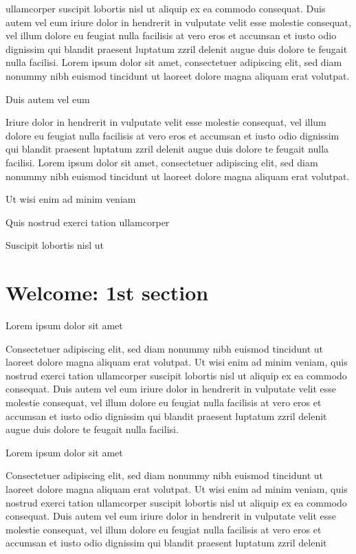 \documentclass[11pt,twoside]{article}\makeatletter
\makeatletter
\renewcommand\section{\@startsection {section}{1}{\z@}%
     {-1.75ex \@plus -0.5ex \@minus -.2ex}%
     {0.5ex \@plus .2ex}%
     {\reset@font\Large\bfseries\sffamily}}
\def\chaptername{Chapter}
\def\mainmatter{%
  \cleardoublepage
  \def\thechapter{\@arabic\c@chapter}
  \setcounter{chapter}{0}
  \setcounter{section}{0}
  \pagenumbering{arabic}
  \setcounter{secnumdepth}{6}
  \def\@chapapp{\chaptername}%
  \def\theHchapter{\arabic{chapter}}
}
\def\DivI{\section}
\def\DivI{\chapter}
\makeatother
\begin{document}
      ullamcorper suscipit lobortis nisl ut aliquip ex ea commodo
      consequat. Duis autem vel eum iriure dolor in hendrerit in vulputate
      velit esse molestie consequat, vel illum dolore eu feugiat nulla
      facilisis at vero eros et accumsan et iusto odio dignissim qui blandit
      praesent luptatum zzril delenit augue duis dolore te feugait nulla
      facilisi. Lorem ipsum dolor sit amet, consectetuer adipiscing elit,
      sed diam nonummy nibh euismod tincidunt ut laoreet dolore magna
      aliquam erat volutpat. \par Duis autem vel eum \par Iriure dolor in hendrerit in vulputate velit esse molestie
      consequat, vel illum dolore eu feugiat nulla facilisis at vero eros et
      accumsan et iusto odio dignissim qui blandit praesent luptatum zzril
      delenit augue duis dolore te feugait nulla facilisi. Lorem ipsum dolor
      sit amet, consectetuer adipiscing elit, sed diam nonummy nibh euismod
      tincidunt ut laoreet dolore magna aliquam erat volutpat. \par Ut wisi enim ad minim veniam\par Quis nostrud exerci tation ullamcorper \par Suscipit lobortis nisl ut \mainmatter 
\DivI[Welcome: 1st section]{Welcome: 1st section}\label{part1}\par Lorem ipsum dolor sit amet\par Consectetuer adipiscing elit, sed diam nonummy nibh euismod
      tincidunt ut laoreet dolore magna aliquam erat volutpat. Ut wisi enim
      ad minim veniam, quis nostrud exerci tation ullamcorper suscipit
      lobortis nisl ut aliquip ex ea commodo consequat. Duis autem vel eum
      iriure dolor in hendrerit in vulputate velit esse molestie consequat,
      vel illum dolore eu feugiat nulla facilisis at vero eros et accumsan
      et iusto odio dignissim qui blandit praesent luptatum zzril delenit
      augue duis dolore te feugait nulla facilisi.\par Lorem ipsum dolor sit amet\par Consectetuer adipiscing elit, sed diam nonummy nibh euismod
      tincidunt ut laoreet dolore magna aliquam erat volutpat. Ut wisi enim
      ad minim veniam, quis nostrud exerci tation ullamcorper suscipit
      lobortis nisl ut aliquip ex ea commodo consequat. Duis autem vel eum
      iriure dolor in hendrerit in vulputate velit esse molestie consequat,
      vel illum dolore eu feugiat nulla facilisis at vero eros et accumsan
      et iusto odio dignissim qui blandit praesent luptatum zzril delenit
\end{document}
